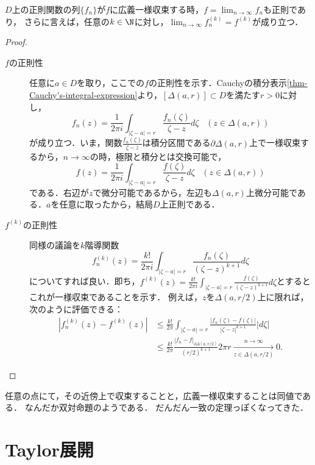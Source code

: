 \documentclass[uplatex, dvipdfmx]{jsreport}
\begin{document}
\begin{theorem}\label{thm-propagation-of-regularity-through-compact-convergence}
    $D$上の正則関数の列$\{f_n\}$が$f$に広義一様収束する時，$f=\lim_{n\to\infty}f_n$も正則であり，
    さらに言えば，任意の$k\in\N$に対し，$\lim_{n\to\infty}f^{(k)}_n=f^{(k)}$が成り立つ．
\end{theorem}
\begin{proof}
    \begin{description}
        \item[$f$の正則性] 
    任意に$a\in D$を取り，ここでの$f$の正則性を示す．Cauchyの積分表示\ref{thm-Cauchy's-integral-expression}より，$[\Delta(a,r)]\subset D$を満たす$r>0$に対し，
    \[ f_n(z)=\frac{1}{2\pi i}\int_{|\zeta-a|=r}\frac{f_n(\zeta)}{\zeta-z}d\zeta\;\;\;(z\in\Delta(a,r)) \]
    が成り立つ．いま，関数$\frac{f_n(\zeta)}{\zeta-z}$は積分区間である$\partial\Delta(a,r)$上で一様収束するから，$n\to\infty$の時，極限と積分とは交換可能で，
    \[ f(z)=\frac{1}{2\pi i}\int_{|\zeta-a|=r}\frac{f(\zeta)}{\zeta-z}d\zeta\;\;\;(z\in\Delta(a,r)) \]
    である．右辺が$z$で微分可能であるから，左辺も$\Delta(a,r)$上微分可能である．$a$を任意に取ったから，結局$D$上正則である．
        \item[$f^{(k)}$の正則性] 同様の議論を$k$階導関数
    \[f_n^{(k)}(z)=\frac{k!}{2\pi i}\int_{|\zeta-a|=r}\frac{f_n(\zeta)}{(\zeta-z)^{k+1}}d\zeta\] 
    についてすれば良い．即ち，$f^{(k)}(z)=\frac{k!}{2\pi i}\int_{|\zeta-a|=r}\frac{f(\zeta)}{(\zeta-z)^{k+1}}d\zeta$とするとこれが一様収束であることを示す．
    例えば，$z$を$\Delta(a,r/2)$上に限れば，次のように評価できる：
    \begin{align*}
        |f_n^{(k)}(z)-f^{(k)}(z)|&\le\frac{k!}{2\pi}\int_{|\zeta-a|=r}\frac{|f_n(\zeta)-f(\zeta)|}{|\zeta-z|^{k+1}}|d\zeta|\\
        &\le\frac{k!}{2\pi}\frac{|f_n-f|_{\partial\Delta(a,r/2)}}{(r/2)^{k+1}}2\pi r\xrightarrow[z\in\Delta(a,r/2)]{n\to\infty}0.
    \end{align*}
    \end{description}
\end{proof}

\begin{screen}
    任意の点にて，その近傍上で収束することと，広義一様収束することは同値である．
    なんだか双対命題のようである．
    だんだん一致の定理っぽくなってきた．
\end{screen}

\section{Taylor展開}
\end{document}

